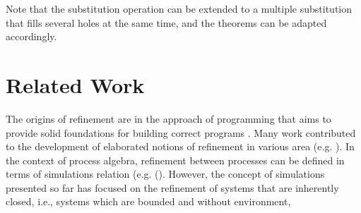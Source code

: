 \documentclass[runningheads]{llncs}
\begin{document}
%
%
%
%

Note that the substitution operation can be extended to a multiple substitution that fills several holes at the same time, and the theorems can be adapted accordingly.


\section{Related Work}
\label{sec:sota}



The origins of refinement are in the  approach of programming that aims to provide solid foundations for building correct programs \cite{Dijkstra76}.  Many work  contributed to the  development of elaborated notions of refinement  in various area (e.g. \cite{BACK1990133,Abrialbooks96,soton250550,Bellegarde:2000}).
In the context of process algebra, refinement between processes can be defined in terms of simulations relation (e.g. (\cite{Jifeng:1089,Milner:1980}). However, the concept of simulations presented so far has focused on the refinement of systems that are inherently closed, i.e., systems which are bounded and without environment,
 
\end{document}
